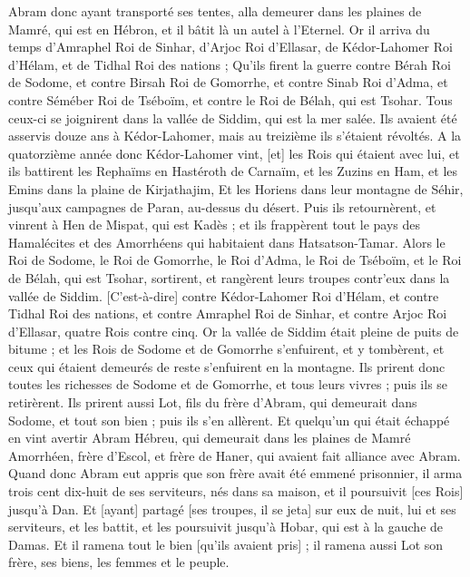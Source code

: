\begin{multicols}{2}
Abram donc ayant transporté ses tentes, alla demeurer dans les plaines de Mamré, qui est en Hébron, et il bâtit là un autel à l'Eternel.
\VerseOne{}Or il arriva du temps d'Amraphel Roi de Sinhar, d'Arjoc Roi d'Ellasar, de Kédor-Lahomer Roi d'Hélam, et de Tidhal Roi des nations ;
Qu'ils firent la guerre contre Bérah Roi de Sodome, et contre Birsah Roi de Gomorrhe, et contre Sinab Roi d'Adma, et contre Séméber Roi de Tséboïm, et contre le Roi de Bélah, qui est Tsohar.
Tous ceux-ci se joignirent dans la vallée de Siddim, qui est la mer salée.
Ils avaient été asservis douze ans à Kédor-Lahomer, mais au treizième ils s'étaient révoltés.
A la quatorzième année donc Kédor-Lahomer vint, [et] les Rois qui étaient avec lui, et ils battirent les Rephaïms en Hastéroth de Carnaïm, et les Zuzins en Ham, et les Emins dans la plaine de Kirjathajim,
Et les Horiens dans leur montagne de Séhir, jusqu'aux campagnes de Paran, au-dessus du désert.
Puis ils retournèrent, et vinrent à Hen de Mispat, qui est Kadès ; et ils frappèrent tout le pays des Hamalécites et des Amorrhéens qui habitaient dans Hatsatson-Tamar.
Alors le Roi de Sodome, le Roi de Gomorrhe, le Roi d'Adma, le Roi de Tséboïm, et le Roi de Bélah, qui est Tsohar, sortirent, et rangèrent leurs troupes contr'eux dans la vallée de Siddim.
[C'est-à-dire] contre Kédor-Lahomer Roi d'Hélam, et contre Tidhal Roi des nations, et contre Amraphel Roi de Sinhar, et contre Arjoc Roi d'Ellasar, quatre Rois contre cinq.
Or la vallée de Siddim était pleine de puits de bitume ; et les Rois de Sodome et de Gomorrhe s'enfuirent, et y tombèrent, et ceux qui étaient demeurés de reste s'enfuirent en la montagne.
Ils prirent donc toutes les richesses de Sodome et de Gomorrhe, et tous leurs vivres ; puis ils se retirèrent.
Ils prirent aussi Lot, fils du frère d'Abram, qui demeurait dans Sodome, et tout son bien ; puis ils s'en allèrent.
Et quelqu'un qui était échappé en vint avertir Abram Hébreu, qui demeurait dans les plaines de Mamré Amorrhéen, frère d'Escol, et frère de Haner, qui avaient fait alliance avec Abram.
Quand donc Abram eut appris que son frère avait été emmené prisonnier, il arma trois cent dix-huit de ses serviteurs, nés dans sa maison, et il poursuivit [ces Rois] jusqu'à Dan.
Et [ayant] partagé [ses troupes, il se jeta] sur eux de nuit, lui et ses serviteurs, et les battit, et les poursuivit jusqu'à Hobar, qui est à la gauche de Damas.
Et il ramena tout le bien [qu'ils avaient pris] ; il ramena aussi Lot son frère, ses biens, les femmes et le peuple.

\end{multicols}
